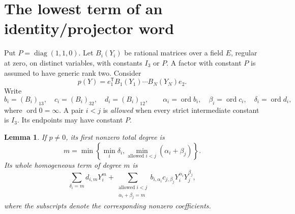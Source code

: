 \documentclass[11pt]{article}
\newtheorem{lemma}[theorem]{Lemma}
\newcommand{\ord}{\operatorname{ord}}
\begin{document}
\section{The lowest term of an identity/projector word}

Put \(P=\operatorname{diag}(1,1,0)\). Let \(B_i(Y_i)\) be rational
matrices over a field \(E\), regular at zero, on distinct variables,
with constants \(I_3\) or \(P\). A factor with constant \(P\) is
assumed to have generic rank two. Consider
\[
 p(Y)=e_1^{\mathsf T}B_1(Y_1)\cdots B_N(Y_N)e_2.
\]
Write
\[
 b_i=(B_i)_{13},\quad c_i=(B_i)_{32},\quad d_i=(B_i)_{12},
 \qquad
 \alpha_i=\ord b_i,\quad\beta_i=\ord c_i,\quad\delta_i=\ord d_i,
\]
where \(\ord0=\infty\). A pair \(i<j\) is \emph{allowed} when every
strict intermediate constant is \(I_3\). Its endpoints may have
constant \(P\).

\begin{lemma}\label{lem:lowest}
If \(p\ne0\), its first nonzero total degree is
\begin{equation}\label{eq:min}
 m=\min\left\{\min_i\delta_i,
         \min_{\text{allowed }i<j}(\alpha_i+\beta_j)\right\}.
\end{equation}
Its whole homogeneous term of degree \(m\) is
\begin{equation}\label{eq:leading}
 \sum_{\delta_i=m}d_{i,m}Y_i^m+
 \sum_{\substack{\text{allowed }i<j\\\alpha_i+\beta_j=m}}
 b_{i,\alpha_i}c_{j,\beta_j}Y_i^{\alpha_i}Y_j^{\beta_j},
\end{equation}
where the subscripts denote the corresponding nonzero coefficients.
\end{lemma}
\end{document}
